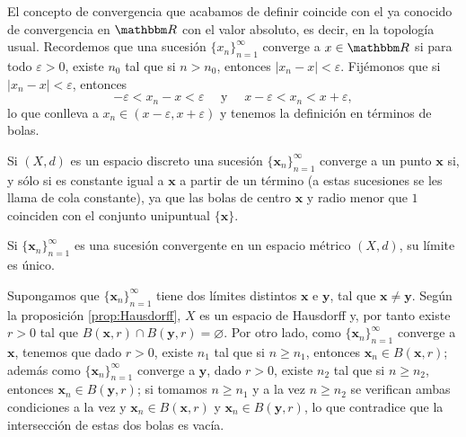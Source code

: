 \begin{examplebox}{}{}
    El concepto de convergencia que acabamos de definir coincide con el ya conocido de convergencia en $\RR$ con el valor absoluto, es decir, en la topología usual. Recordemos que una sucesión $\{x_n\}_{n = 1}^{\infty}$ converge a $x \in \RR$ si para todo $\varepsilon > 0$, existe $n_0$ tal que si $n > n_0$, entonces $|x_n - x| < \varepsilon$. Fijémonos que si $|x_n - x| < \varepsilon$, entonces
    $$-\varepsilon < x_n - x < \varepsilon \quad \text{ y } \quad x - \varepsilon < x_n < x + \varepsilon,$$
    lo que conlleva a $x_n \in (x - \varepsilon, x + \varepsilon)$ y tenemos la definición en términos de bolas.
\end{examplebox}

\begin{examplebox}{}{}
    Si $(X, d)$ es un espacio discreto una sucesión $\{\mathbf{x}_n\}_{n = 1}^{\infty}$ converge a un punto $\mathbf{x}$ si, y sólo si es constante igual a $\mathbf{x}$ a partir de un término (a estas sucesiones se les llama de cola constante), ya que las bolas de centro $\mathbf{x}$ y radio menor que $1$ coinciden con el conjunto unipuntual $\{\mathbf{x}\}$.
\end{examplebox}

\begin{theorem}{}{}
    Si $\{\mathbf{x}_n\}_{n = 1}^{\infty}$ es una sucesión convergente en un espacio métrico $(X, d)$, su límite es único.

    \tcblower
    \demostracion Supongamos que $\{\mathbf{x}_n\}_{n = 1}^{\infty}$ tiene dos límites distintos $\mathbf{x}$ e $\mathbf{y}$, tal que $\mathbf{x} \neq \mathbf{y}$. Según la proposición \ref{prop:Hausdorff}, $X$ es un espacio de Hausdorff y, por tanto existe $r > 0$ tal que $B(\mathbf{x}, r) \cap B(\mathbf{y}, r) = \varnothing$. Por otro lado, como $\{\mathbf{x}_n\}_{n = 1}^{\infty}$ converge a $\mathbf{x}$, tenemos que dado $r > 0$, existe $n_1$ tal que si $n \geq n_1$, entonces $\mathbf{x}_n \in B(\mathbf{x}, r)$; además como $\{\mathbf{x}_n\}_{n = 1}^{\infty}$ converge a $\mathbf{y}$, dado $r > 0$, existe $n_2$ tal que si $n \geq n_2$, entonces $\mathbf{x}_n \in B(\mathbf{y}, r)$; si tomamos $n \geq n_1$ y a la vez $n \geq n_2$ se verifican ambas condiciones a la vez y $\mathbf{x}_n \in B(\mathbf{x}, r)$ y $\mathbf{x}_n \in B(\mathbf{y}, r)$, lo que contradice que la intersección de estas dos bolas es vacía.
\end{theorem}

\newpage

